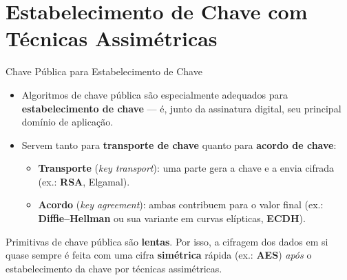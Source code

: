 \documentclass{beamer}
\begin{document}
\section{Estabelecimento de Chave com Técnicas Assimétricas}

\begin{frame}{Chave Pública para Estabelecimento de Chave}
    \begin{itemize}
        \item Algoritmos de chave pública são especialmente adequados para \textbf{estabelecimento de chave} --- é, junto da assinatura digital, seu principal domínio de aplicação.
        \medskip
        \item Servem tanto para \textbf{transporte de chave} quanto para \textbf{acordo de chave}:
        \begin{itemize}
            \footnotesize
            \item \textbf{Transporte} (\textit{key transport}): uma parte gera a chave e a envia cifrada (ex.: \textbf{RSA}, Elgamal).
            \item \textbf{Acordo} (\textit{key agreement}): ambas contribuem para o valor final (ex.: \textbf{Diffie--Hellman} ou sua variante em curvas elípticas, \textbf{ECDH}).
        \end{itemize}
    \end{itemize}
    \medskip
    \begin{tcolorbox}[colback=blue!5,colframe=blue!50!black,boxrule=0.5pt]
        \footnotesize
        Primitivas de chave pública são \textbf{lentas}. Por isso, a cifragem dos dados em si quase sempre é feita com uma cifra \textbf{simétrica} rápida (ex.: \textbf{AES}) \emph{após} o estabelecimento da chave por técnicas assimétricas.
    \end{tcolorbox}
\end{frame}
\end{document}
